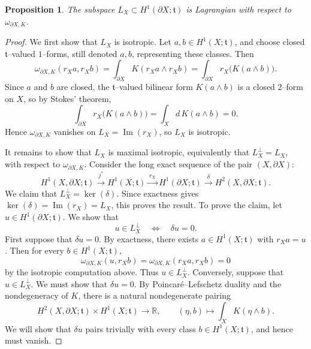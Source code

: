 \documentclass[12pt]{amsart}
\numberwithin{equation}{section}
\newtheorem{prop}[theorem]{Proposition}
\begin{document}
\begin{prop}
\label{prop:toral-boundary-lagrangian}
The subspace \(L_X\subset H^1(\partial X;\mathfrak t)\) is Lagrangian with
respect to $\omega_{\partial X,K}$.
\end{prop}

\begin{proof}
We first show that $L_X$ is isotropic. Let $a,b\in H^1(X;\mathfrak t)$, and choose closed
$\mathfrak t$--valued $1$--forms, still denoted $a,b$, representing these classes. Then
\[
\omega_{\partial X,K}(r_X a,r_X b)
=
\int_{\partial X} K(r_X a\wedge r_X b)
=
\int_{\partial X} r_X\!\bigl(K(a\wedge b)\bigr).
\]
Since $a$ and $b$ are closed, the $\mathfrak t$--valued bilinear form $K(a\wedge b)$ is a closed
$2$--form on $X$, so by Stokes' theorem,
\[
\int_{\partial X} r_X\!\bigl(K(a\wedge b)\bigr)
=
\int_X d\,K(a\wedge b)=0.
\]
Hence $\omega_{\partial X,K}$ vanishes on $L_X=\operatorname{Im}(r_X)$, so $L_X$ is isotropic.

It remains to show that $L_X$ is maximal isotropic, equivalently that $L_X^\perp=L_X$,  with respect to $\omega_{\partial X,K}$. Consider the long exact sequence of the pair $(X,\partial X)$:
\[
H^1(X,\partial X;\mathfrak t)\xrightarrow{\,j^*\,} H^1(X;\mathfrak t)
\xrightarrow{\,r_X\,} H^1(\partial X;\mathfrak t)
\xrightarrow{\,\delta\,} H^2(X,\partial X;\mathfrak t).
\]
We claim that $L_X^\perp=\ker(\delta).$ Since exactness gives $\ker(\delta)=\operatorname{Im}(r_X)=L_X$, this proves the result. To prove the claim, let $u\in H^1(\partial X;\mathfrak t)$. We show that
\[
u\in L_X^\perp \quad\Longleftrightarrow\quad \delta u=0.
\]
First suppose that $\delta u=0$. By exactness, there exists $a\in H^1(X;\mathfrak t)$ with
$r_X a=u$. Then for every $b\in H^1(X;\mathfrak t)$,
\[
\omega_{\partial X,K}(u,r_X b)=\omega_{\partial X,K}(r_X a,r_X b)=0
\]
by the isotropic computation above. Thus $u\in L_X^\perp$. Conversely, suppose that $u\in L_X^\perp$. We must show that $\delta u=0$. By
Poincar\'e--Lefschetz duality and the nondegeneracy of $K$, there is a natural nondegenerate pairing
\[
H^2(X,\partial X;\mathfrak t)\times H^1(X;\mathfrak t)\longrightarrow \mathbb R,
\qquad
(\eta,b)\longmapsto \int_X K(\eta\wedge b).
\]
We will show that $\delta u$ pairs trivially with every class $b\in H^1(X;\mathfrak t)$, and hence
must vanish.


\end{proof}
\end{document}
